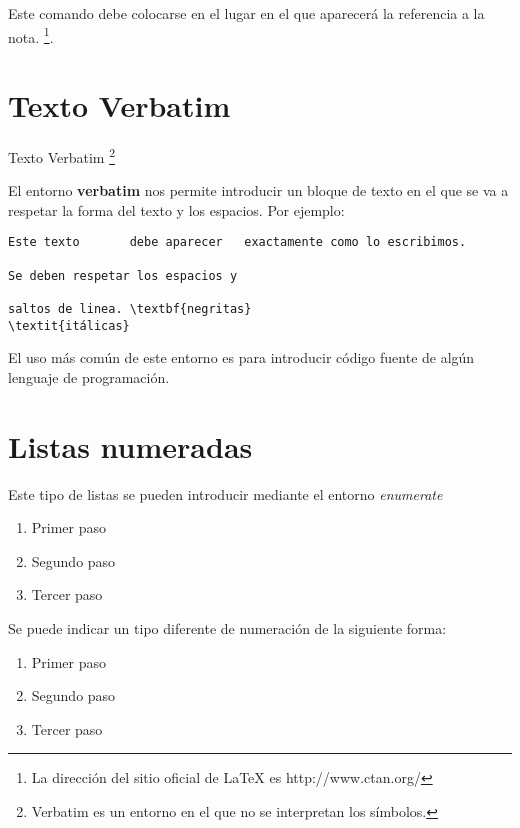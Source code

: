 \documentclass[letterpaper,12pt]{report}
\begin{document}
Este comando debe colocarse en el lugar en el que aparecerá la referencia a la nota. \footnote{La dirección del sitio oficial de \LaTeX{} es http://www.ctan.org/}.

\chapter{Texto Verbatim}
Texto Verbatim \footnote{Verbatim es un entorno en el que no se interpretan los símbolos.}


El entorno \textbf{verbatim} nos permite introducir un bloque de texto en el que se va a respetar la forma del texto y los espacios. Por ejemplo:

\begin{verbatim}
Este texto       debe aparecer   exactamente como lo escribimos.

Se deben respetar los espacios y

saltos de linea. \textbf{negritas} 
\textit{itálicas}
\end{verbatim}

El uso más común de este entorno es para introducir código fuente de algún lenguaje de programación.

\chapter{Listas numeradas}
Este tipo de listas se pueden introducir mediante el entorno \textit{enumerate}

\begin{enumerate}
	\item Primer paso
	\item Segundo paso
	\item Tercer paso
\end{enumerate}


Se puede indicar un tipo diferente de numeración de la siguiente forma:

\begin{enumerate}[I]
	\item Primer paso
	\item Segundo paso
	\item Tercer paso
\end{enumerate}
\end{document}
